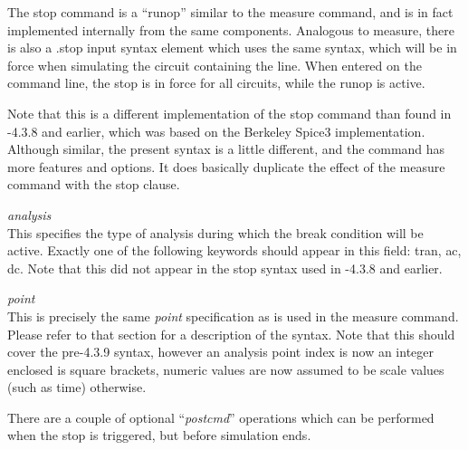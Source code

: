 The {\cb stop} command is a ``runop'' similar to the {\cb measure}
command, and is in fact implemented internally from the same
components.  Analogous to {\cb measure}, there is also a {\vt .stop}
input syntax element which uses the same syntax, which will be in
force when simulating the circuit containing the line.  When entered
on the command line, the stop is in force for all circuits, while the
runop is active.

Note that this is a different implementation of the {\cb stop} command
than found in {\WRspice}-4.3.8 and earlier, which was based on the
Berkeley Spice3 implementation.  Although similar, the present syntax
is a little different, and the command has more features and options. 
It does basically duplicate the effect of the {\cb measure} command
with the {\vt stop} clause.

\begin{description}
\item{\it analysis}\\
This specifies the type of analysis during which the break condition
will be active.  Exactly one of the following keywords should appear
in this field:  {\vt tran}, {\vt ac}, {\vt dc}.  Note that this did
not appear in the {\cb stop} syntax used in {\WRspice}-4.3.8 and
earlier.

\item{\it point}\\
This is precisely the same {\it point} specification as is used in the
{\cb measure} command.  Please refer to that section for a description
of the syntax.  Note that this should cover the pre-4.3.9 syntax,
however an analysis point index is now an integer enclosed is square
brackets, numeric values are now assumed to be scale values (such as
time) otherwise.
\end{description}

There are a couple of optional ``{\it postcmd}'' operations which can
be performed when the stop is triggered, but before simulation ends.

